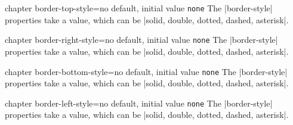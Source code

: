 \begin{docKey}[]{chapter border-top-style}{=}{no default, initial value \texttt{none}}
The |border-style| properties take a value, which can be |solid, double, dotted, dashed, asterisk|.
\end{docKey}

\begin{docKey}[]{chapter border-right-style}{=}{no default, initial value \texttt{none}}
The |border-style| properties take a value, which can be |solid, double, dotted, dashed, asterisk|.
\end{docKey}

\begin{docKey}[]{chapter border-bottom-style}{=}{no default, initial value \texttt{none}}
The |border-style| properties take a value, which can be |solid, double, dotted, dashed, asterisk|.
\end{docKey}

\begin{docKey}[]{chapter border-left-style}{=}{no default, initial value \texttt{none}}
The |border-style| properties take a value, which can be |solid, double, dotted, dashed, asterisk|.
\end{docKey}

